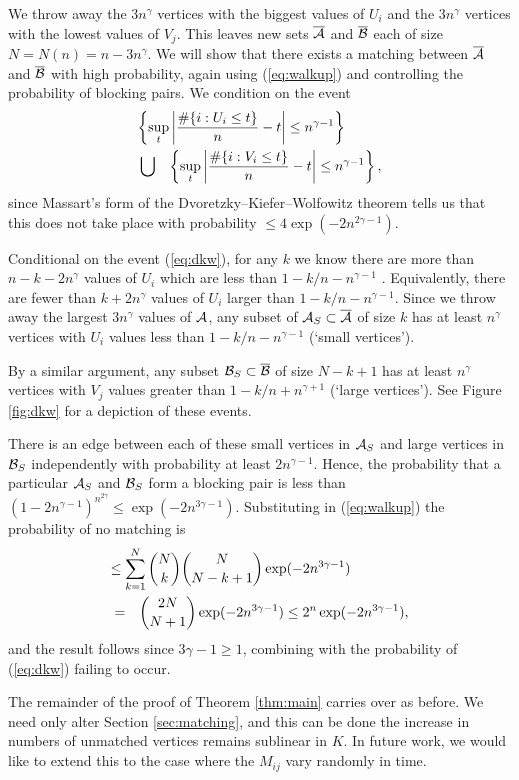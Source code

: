 \documentclass[journal]{IEEEtran}
\begin{document}
\begin{IEEEproof} 
We 
throw away the
$3 n^{\gamma}$ vertices with the biggest values of $U_i$ and the $3 n^\gamma$ vertices
with the lowest values of $V_j$.
This leaves  new sets $\overline{{\mathcal{A}}}$ and $\overline{{\mathcal{B}}}$ each
of size $N = N(n) = n - 3 n^\gamma$. We will show that there exists a matching between 
$\overline{{\mathcal{A}}}$ and $\overline{{\mathcal{B}}}$ with high probability, again using 
(\ref{eq:walkup}) and controlling the probability of blocking pairs.
We condition on the event  
\begin{eqnarray} 
\lefteqn{
 \left\{ \sup_t \left| \frac{\# \{ i: U_i \leq t \}}{n} - t \right| \leq n^{\gamma-1} \right\}   } \nonumber \\
& \bigcup & 
\left\{ \sup_t \left| \frac{\# \{ i: V_i \leq t \}}{n} - t \right| \leq n^{\gamma-1}
\right\}, \label{eq:dkw}
\end{eqnarray}
since Massart's form of the Dvoretzky--Kiefer--Wolfowitz theorem \cite{massart}
 tells us that this does not take place with probability $\leq 
4 \exp( - 2n^{2\gamma-1})$.

Conditional on the event (\ref{eq:dkw}), for any $k$
we know there are more than $n-k-2n^\gamma$ values of $U_i$
which are less than $1-k/n - n^{\gamma-1}$ %
. Equivalently,
there are fewer than $k + 2 n^{\gamma}$ values of $U_i$ larger than $1-k/n - n^{\gamma-1}$.
Since we throw away the largest $3 n^{\gamma}$ values of ${\mathcal{A}}$, 
any subset of ${\mathcal{A}}_S \subset \overline{{\mathcal{A}}}$ of size $k$ has at least
$n^{\gamma}$ vertices with $U_i$ values less than $1-k/n - n^{\gamma-1}$ (`small vertices').

By a similar argument, any subset ${\mathcal{B}}_S \subset \overline{{\mathcal{B}}}$ of size $N-k+1$ 
has at least $n^{\gamma}$ vertices with $V_j$ values greater than $1-k/n + n^{\gamma +1}$
(`large vertices'). See Figure \ref{fig:dkw} for a depiction of these events.


There is an edge between each of these small vertices in ${\mathcal{A}}_S$ and large vertices
in ${\mathcal{B}}_S$ independently with probability at least $2 n^{\gamma-1}$.
Hence, the probability that a particular ${\mathcal{A}}_S$ and ${\mathcal{B}}_S$ form a blocking pair is less
than 
$(1 - 2 n^{\gamma-1})^{ n^{2\gamma}} \leq \exp( - 2 n^{3 \gamma - 1}).$
Substituting in (\ref{eq:walkup}) the probability of no matching
is 
\begin{eqnarray*}
\lefteqn{
 \leq \sum_{k=1}^N \binom{N}{k} \binom{N}{N-k+1} \exp( - 2 n^{3 \gamma - 1}) 
} \\& = &
\binom{2N}{N+1} \exp(-2 n^{3 \gamma-1}) 
\leq 2^n \exp(-2 n^{3 \gamma-1}),
\end{eqnarray*}
and the result follows since $3 \gamma - 1 \geq 1$, combining with the probability of
(\ref{eq:dkw}) failing to occur.
\end{IEEEproof}
%
The remainder of the proof of Theorem \ref{thm:main} carries over as before. We
need only alter Section \ref{sec:matching}, and this can be done  the 
increase in numbers of unmatched vertices remains sublinear in $K$.
In future work, we would like to extend this to the case where 
the $M_{ij}$ vary randomly in time.
%
\end{document}
